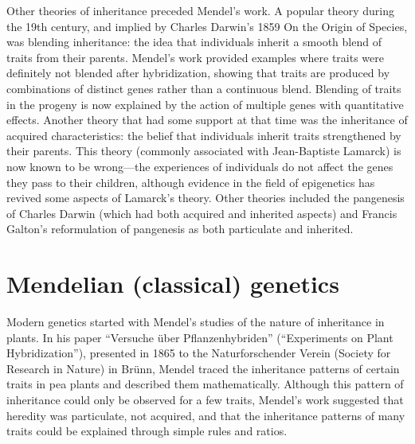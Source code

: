Other theories of inheritance preceded Mendel's work. A popular theory during the 19th century, and implied by Charles Darwin's 1859 On the Origin of Species, was blending inheritance: the idea that individuals inherit a smooth blend of traits from their parents. Mendel's work provided examples where traits were definitely not blended after hybridization, showing that traits are produced by combinations of distinct genes rather than a continuous blend. Blending of traits in the progeny is now explained by the action of multiple genes with quantitative effects. Another theory that had some support at that time was the inheritance of acquired characteristics: the belief that individuals inherit traits strengthened by their parents. This theory (commonly associated with Jean-Baptiste Lamarck) is now known to be wrong---the experiences of individuals do not affect the genes they pass to their children, although evidence in the field of epigenetics has revived some aspects of Lamarck's theory. Other theories included the pangenesis of Charles Darwin (which had both acquired and inherited aspects) and Francis Galton's reformulation of pangenesis as both particulate and inherited.

\hypertarget{mendelian-classical-genetics}{%
\section{Mendelian (classical) genetics}\label{mendelian-classical-genetics}}

Modern genetics started with Mendel's studies of the nature of inheritance in plants. In his paper ``Versuche über Pflanzenhybriden'' (``Experiments on Plant Hybridization''), presented in 1865 to the Naturforschender Verein (Society for Research in Nature) in Brünn, Mendel traced the inheritance patterns of certain traits in pea plants and described them mathematically. Although this pattern of inheritance could only be observed for a few traits, Mendel's work suggested that heredity was particulate, not acquired, and that the inheritance patterns of many traits could be explained through simple rules and ratios.



